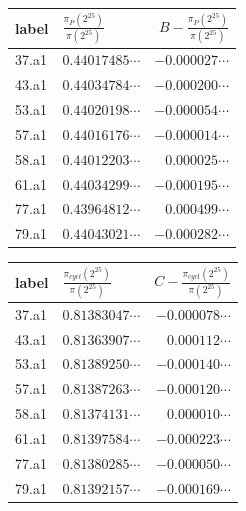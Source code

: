 \documentclass[12pt,handout]{beamer} %
\theoremstyle{definition}
\begin{document}
\begin{frame}
\begin{center}
\begin{tabular}{|l|l|r|}
\hline
\hspace*{-1mm} label \hspace*{-3mm}&\!\! $\frac{\pi_P(2^{25})}{\pi(2^{25})}$\!\!&\!\! $B-\frac{\pi_P(2^{25})}{\pi(2^{25})}$\!\!\\
\hline
37.a1 &$0.44017485\cdots$&   $-0.000027\cdots$\\
43.a1 &$0.44034784\cdots$&   $-0.000200\cdots$\\
53.a1 &$0.44020198\cdots$&   $-0.000054\cdots$\\
57.a1 &$0.44016176\cdots$&   $-0.000014\cdots$\\
58.a1 &$0.44012203\cdots$&    $0.000025\cdots$\\
61.a1 &$0.44034299\cdots$&   $-0.000195\cdots$\\                       
77.a1 &$0.43964812\cdots$&    $0.000499\cdots$\\
79.a1 &$0.44043021\cdots$&  $ -0.000282\cdots$\\
\hline
\end{tabular}\pause

\begin{tabular}{|l|l|r|}
\hline
\hspace*{-1mm} label \hspace*{-3mm}&\!\! $\frac{\pi_{cycl}(2^{25})}{\pi(2^{25})}$\!\!&\!\! $C-\frac{\pi_{cycl}(2^{25})}{\pi(2^{25})}$\!\!\\
\hline
37.a1 &$0.81383047\cdots$&   $-0.000078\cdots$\\
43.a1 &$0.81363907\cdots$&   $ 0.000112\cdots$\\
53.a1 &$0.81389250\cdots$&   $-0.000140\cdots$\\
57.a1 &$0.81387263\cdots$&   $-0.000120\cdots$\\
58.a1 &$0.81374131\cdots$&   $ 0.000010\cdots$\\
61.a1 &$0.81397584\cdots$&   $-0.000223\cdots$\\                       
77.a1 &$0.81380285\cdots$&   $-0.000050\cdots$\\
79.a1 &$0.81392157\cdots$&   $-0.000169\cdots$\\\hline
\end{tabular}
\end{center}
\end{frame}
\end{document}
